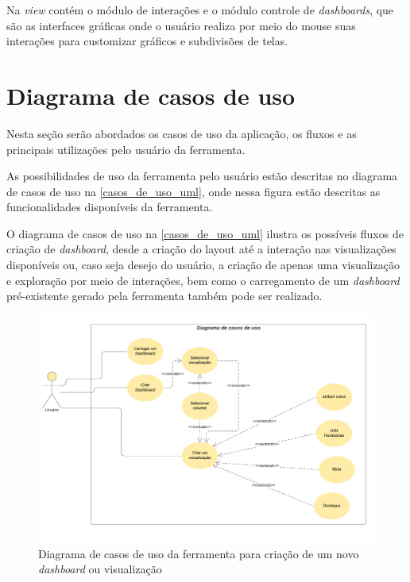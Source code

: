 \documentclass[
	12pt,				%
	openright,			%
	oneside,			%
	a4paper,			%
	english,			%
	brazil				%
	]{abntex2}
\begin{document}
Na \textit{view} contém o módulo de interações e o módulo controle de \textit{dashboards}, que são as interfaces gráficas onde o usuário realiza por meio do mouse suas interações para customizar gráficos e subdivisões de telas.


\section{Diagrama de casos de uso}
Nesta seção serão abordados os casos de uso da aplicação, os fluxos e as principais utilizações pelo usuário da ferramenta.

As possibilidades de uso da ferramenta pelo usuário estão descritas no diagrama de casos de uso na \autoref{casos_de_uso_uml}, onde nessa figura estão descritas as funcionalidades disponíveis da ferramenta.

O diagrama de casos de uso na \autoref{casos_de_uso_uml} ilustra os possíveis fluxos de criação de \textit{dashboard}, desde a criação do layout até a interação nas visualizações disponíveis ou, caso seja desejo do usuário, a criação de apenas uma visualização e exploração por meio de interações, bem como o carregamento de um \textit{dashboard} pré-existente gerado pela ferramenta também pode ser realizado.

\begin{figure}
	\caption{\label{casos_de_uso_uml}Diagrama de casos de uso da ferramenta para criação de um novo \textit{dashboard} ou visualização }
	\begin{center}
	    \includegraphics[width=35pc,size=1]{figures/Diagrama de casos de uso.pdf}
	\end{center}
\end{figure}
\end{document}
